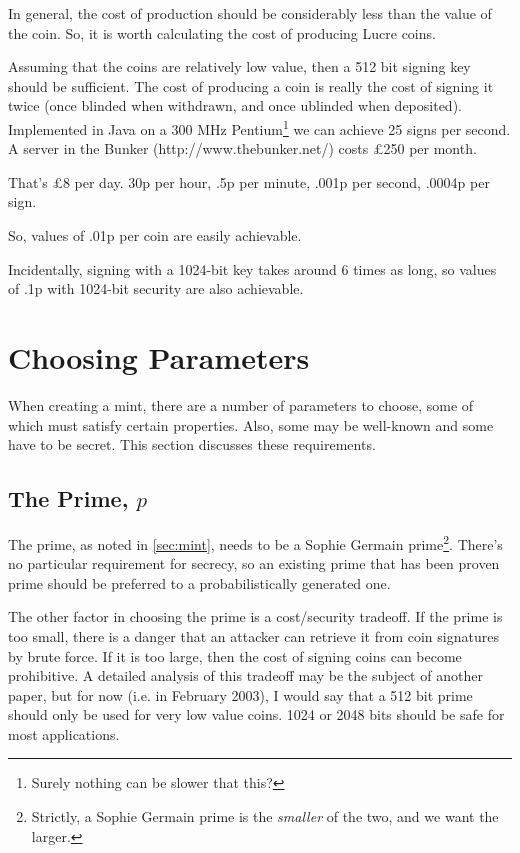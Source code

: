 \documentclass[a4paper,titlepage]{article}
\begin{document}
In general, the cost of production should be considerably
less than the value of the coin. So, it is worth calculating the cost
of producing Lucre coins.

Assuming that the coins are relatively low value, then a 512 bit
signing key should be sufficient. The cost of producing a coin is
really the cost of signing it twice (once blinded when withdrawn, and
once ublinded when deposited). Implemented in Java on a 300 MHz
Pentium\footnote{Surely nothing can be slower that this?} we can
achieve 25 signs per second. A server in the Bunker
(http://www.thebunker.net/) costs \pounds250 per month.

That's \pounds8 per day. 30p per hour, .5p per minute, .001p per second,
.0004p per sign.

So, values of .01p per coin are easily achievable.

Incidentally, signing with a 1024-bit key takes around 6 times as
long, so values of .1p with 1024-bit security are also achievable.

\section{Choosing Parameters}

When creating a mint, there are a number of parameters to choose, some
of which must satisfy certain properties. Also, some may be well-known
and some have to be secret. This section discusses these requirements.

\subsection{The Prime, $p$}

The prime, as noted in \ref{sec:mint}, needs to be a Sophie Germain
prime\footnote{Strictly, a Sophie Germain prime is the {\it smaller} of
the two, and we want the larger.}. There's no particular requirement
for secrecy, so an existing prime that has been proven prime should be
preferred to a probabilistically generated one.

The other factor in choosing the prime is a cost/security tradeoff. If
the prime is too small, there is a danger that an attacker can
retrieve it from coin signatures by brute force. If it is too large,
then the cost of signing coins can become prohibitive. A detailed
analysis of this tradeoff may be the subject of another paper, but for
now (i.e. in February 2003), I would say that a 512 bit prime should
only be used for very low value coins. 1024 or 2048 bits should be
safe for most applications.
\end{document}
